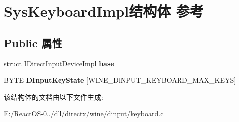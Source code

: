 \hypertarget{struct_sys_keyboard_impl}{}\section{Sys\+Keyboard\+Impl结构体 参考}
\label{struct_sys_keyboard_impl}
\subsection*{Public 属性}
\begin{DoxyCompactItemize}
\item 
\mbox{\label{struct_sys_keyboard_impl_a9ed01ce2d597e938d91d8f5273577d8e}} 
\hyperlink{interfacestruct}{struct} \hyperlink{struct_i_direct_input_device_impl}{I\+Direct\+Input\+Device\+Impl} {\bfseries base}
\item 
\mbox{\label{struct_sys_keyboard_impl_acd819db4effe81da32ab71b742d2c212}} 
B\+Y\+TE {\bfseries D\+Input\+Key\+State} \mbox{[}W\+I\+N\+E\+\_\+\+D\+I\+N\+P\+U\+T\+\_\+\+K\+E\+Y\+B\+O\+A\+R\+D\+\_\+\+M\+A\+X\+\_\+\+K\+E\+YS\mbox{]}
\end{DoxyCompactItemize}


该结构体的文档由以下文件生成\+:\begin{DoxyCompactItemize}
\item 
E\+:/\+React\+O\+S-\/0../dll/directx/wine/dinput/keyboard.\+c\end{DoxyCompactItemize}
